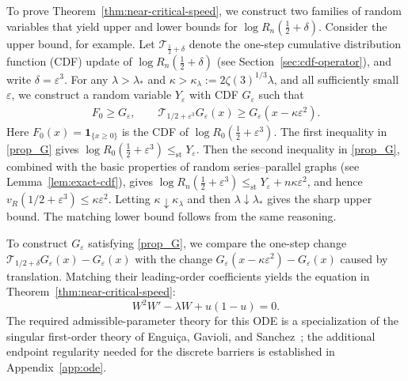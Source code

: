\documentclass[12pt,preprint]{amsart}
\numberwithin{equation}{section}
\theoremstyle{plain}
\theoremstyle{definition}
\newcommand{\stle}{\le_{\mathrm{st}}}
\begin{document}
To prove Theorem~\ref{thm:near-critical-speed}, we construct two families of random variables that yield upper and lower bounds for $\log R_n(\frac12+\delta)$. Consider the upper bound, for example. Let $\mathcal T_{\frac12+\delta}$ denote the one-step cumulative distribution function (CDF)
update of $\log R_n(\frac12+\delta)$ (see Section~\ref{sec:cdf-operator}), and write $\delta=\varepsilon^3$. For any
\(\lambda>\lambda_*\) and
\(\kappa>\kappa_\lambda:=2\zeta(3)^{1/3}\lambda\), and all sufficiently
small \(\varepsilon\), we construct a random variable
\(Y_\varepsilon\) with CDF \(G_\varepsilon\) such that
\begin{align}\label{prop_G}
 F_0\ge G_\varepsilon,
 \qquad
 \mathcal T_{1/2+\varepsilon^3}G_\varepsilon(x)
 \ge G_\varepsilon(x-\kappa\varepsilon^2).
\end{align}
Here $F_0(x)=\mathbf 1_{\{x\ge0\}}$ is the CDF of $\log R_0(\frac12+\varepsilon^3)$. The first inequality in \eqref{prop_G} gives $\log R_0(\frac12+\varepsilon^3)
 \stle Y_\varepsilon$. Then the second inequality in \eqref{prop_G}, combined with the basic properties of random series--parallel graphs (see Lemma~\ref{lem:exact-cdf}), gives
  $\log R_n(\frac12+\varepsilon^3)
 \stle Y_\varepsilon+n\kappa\varepsilon^2$, and hence
\(v_R(1/2+\varepsilon^3)\le\kappa\varepsilon^2\).
Letting \(\kappa\downarrow\kappa_\lambda\) and then
\(\lambda\downarrow\lambda_*\) gives the sharp upper bound. The matching
lower bound follows from the same reasoning.

To construct \(G_\varepsilon\) satisfying \eqref{prop_G}, we compare the  one-step change
\(\mathcal T_{1/2+\delta}G_\varepsilon(x)-G_\varepsilon(x)\) with the change
\(G_\varepsilon(x-\kappa\varepsilon^2)-G_\varepsilon(x)\) caused by translation.
 Matching their leading-order coefficients yields the
equation in Theorem~\ref{thm:near-critical-speed}:
\[
 W^2W'-\lambda W+u(1-u)=0.
\]
The required admissible-parameter theory for this ODE is a specialization of
the singular first-order theory of Engui\c{c}a, Gavioli, and
Sanchez~\cite[Proposition~2.3 and Theorem~3.7]{EnguicaGavioliSanchez2013};
the additional endpoint regularity needed for the discrete barriers is
established in Appendix~\ref{app:ode}.
\end{document}
